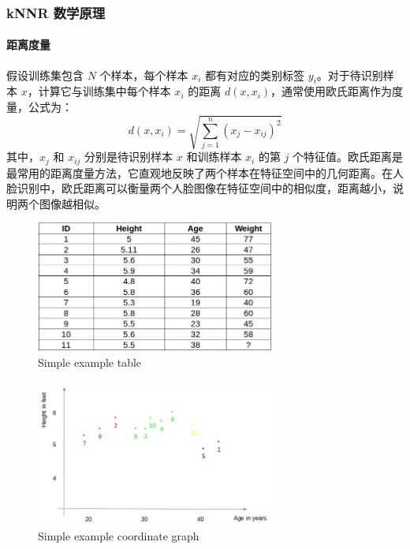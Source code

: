 \documentclass{article}
\begin{document}
\subsubsection{kNNR 数学原理}

\paragraph{距离度量}
假设训练集包含 $N$ 个样本，每个样本 $x_{i}$ 都有对应的类别标签 $y_{i}$。对于待识别样本 $x$，计算它与训练集中每个样本 $x_{i}$ 的距离 $d(x, x_{i})$，通常使用欧氏距离作为度量，公式为：
\[
d(x, x_{i})=\sqrt{\sum_{j = 1}^{n}(x_{j}-x_{ij})^{2}}
\]
其中，$x_{j}$ 和 $x_{ij}$ 分别是待识别样本 $x$ 和训练样本 $x_{i}$ 的第 $j$ 个特征值。欧氏距离是最常用的距离度量方法，它直观地反映了两个样本在特征空间中的几何距离。在人脸识别中，欧氏距离可以衡量两个人脸图像在特征空间中的相似度，距离越小，说明两个图像越相似。
\begin{figure}[H]
    \centering
    \includegraphics[width=0.7\textwidth]{Img/Screenshot-from-2018-08-22-15-03-42.png}
    \caption{Simple example table}
\end{figure}

\begin{figure}[H]
    \centering
    \includegraphics[width=0.7\textwidth]{Img/Screenshot-from-2018-08-22-12-49-19.png}
    \caption{Simple example coordinate graph}
\end{figure}
\end{document}

